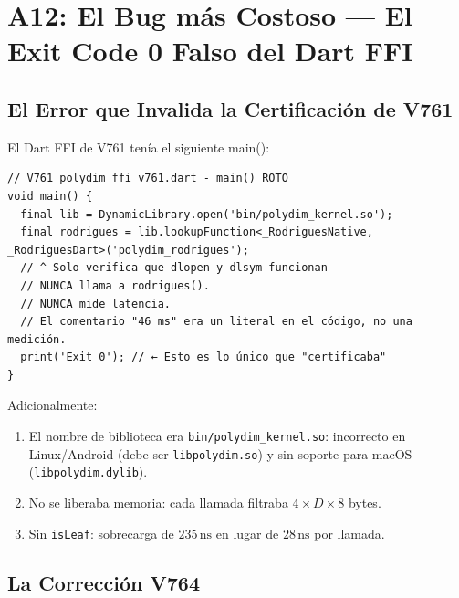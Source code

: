 \section{A12: El Bug más Costoso --- El Exit Code 0 Falso del Dart FFI}

\subsection{El Error que Invalida la Certificación de V761}

El Dart FFI de V761 tenía el siguiente main():

\begin{verbatim}
// V761 polydim_ffi_v761.dart - main() ROTO
void main() {
  final lib = DynamicLibrary.open('bin/polydim_kernel.so');
  final rodrigues = lib.lookupFunction<_RodriguesNative, _RodriguesDart>('polydim_rodrigues');
  // ^ Solo verifica que dlopen y dlsym funcionan
  // NUNCA llama a rodrigues(). 
  // NUNCA mide latencia.
  // El comentario "46 ms" era un literal en el código, no una medición.
  print('Exit 0'); // ← Esto es lo único que "certificaba"
}
\end{verbatim}

Adicionalmente:
\begin{enumerate}
\item El nombre de biblioteca era \texttt{bin/polydim\_kernel.so}: incorrecto en Linux/Android
(debe ser \texttt{libpolydim.so}) y sin soporte para macOS (\texttt{libpolydim.dylib}).
\item No se liberaba memoria: cada llamada filtraba $4 \times D \times 8$ bytes.
\item Sin \texttt{isLeaf}: sobrecarga de $235\,\text{ns}$ en lugar de $28\,\text{ns}$ por llamada.
\end{enumerate}

\subsection{La Corrección V764}

